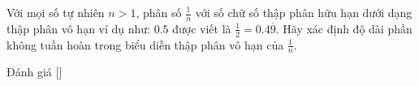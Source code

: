 \ifshowproblem
\begin{problem}\label{problem:IND-2015-MO-P2}
	Với mọi số tự nhiên \( n > 1 \), phân số \( \frac{1}{n} \) với số chữ số thập phân hữu hạn dưới dạng thập phân vô hạn 
	ví dụ như: \( 0.5 \) được viết là \( \frac{1}{2} = 0.4\overline{9} \).
	Hãy xác định độ dài phần không tuần hoàn trong biểu diễn thập phân vô hạn của \( \frac{1}{n} \).
\end{problem}
\fi

\ifshowinfo
Đánh giá [\textbf{}]\footnotemark
{}
\fi